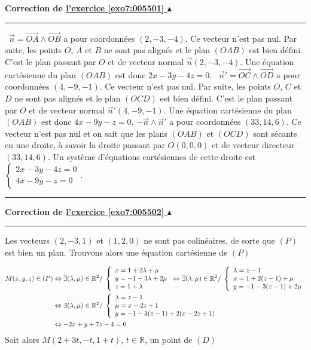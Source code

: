 \documentclass[11pt,a4paper]{article}
\newcommand{\Rr}{\mathbb{R}} \newcommand{\R}{\mathbb{R}}
\newcounter{exo}
\newcommand{\correction}[1]{\hypertarget{cor7:#1}{}\label{cor7:#1}{\bf Correction de \hyperlink{exo7:#1}{l'exercice \ref{exo7:#1} $\blacktriangle$}}\vspace{1mm}\hrule\vspace{1mm}}
\newcommand{\fincorrection}{\vspace{1mm}\hrule\vspace*{7mm}}
\begin{document}
\newpage

\correction{005501}
\textbullet~$\overrightarrow{n}=\overrightarrow{OA}\wedge\overrightarrow{OB}$ a pour coordonnées $(2,-3,-4)$. Ce vecteur n'est pas nul. Par suite, les points $O$, $A$ et $B$ ne sont pas alignés et le plan $(OAB)$ est bien défini. C'est le plan passant par $O$ et de vecteur normal $\overrightarrow{n}(2,-3,-4)$. Une équation cartésienne du plan $(OAB)$ est donc $2x-3y-4z=0$.
\textbullet~$\overrightarrow{n}'=\overrightarrow{OC}\wedge\overrightarrow{OD}$ a pour coordonnées $(4,-9,-1)$. Ce vecteur n'est pas nul. Par suite, les points $O$, $C$ et $D$ ne sont pas alignés et le plan $(OCD)$ est bien défini. C'est le plan passant par $O$ et de vecteur normal $\overrightarrow{n}'(4,-9,-1)$. Une équation cartésienne du plan $(OAB)$ est donc $4x-9y-z=0$.
\textbullet$-\overrightarrow{n}\wedge\overrightarrow{n}'$ a pour coordonnées $(33,14,6)$. Ce vecteur n'est pas nul et on sait que les plans $(OAB)$ et $(OCD)$ sont sécants en une droite, à savoir la droite passant par $O(0,0,0)$ et de vecteur directeur $(33,14,6)$. Un système d'équations cartésiennes de cette droite est 
$\left\{
\begin{array}{l}
2x-3y-4z=0\\
4x-9y-z=0
\end{array}
\right.$.
\fincorrection
\correction{005502}
Les vecteurs $(2,-3,1)$ et $(1,2,0)$ ne sont pas colinéaires, de sorte que $(P)$ est bien un plan. Trouvons alors une équation cartésienne de $(P)$

\begin{align*}\ensuremath
M(x,y,z)\in(P)&\Leftrightarrow\exists(\lambda,\mu)\in\Rr^2/\;
\left\{
\begin{array}{l}
x=1+2\lambda+\mu\\
y=-1-3\lambda+2\mu\\
z=1+\lambda
\end{array}
\right.
\Leftrightarrow\exists(\lambda,\mu)\in\Rr^2/\;
\left\{
\begin{array}{l}
\lambda=z-1\\
x=1+2(z-1)+\mu\\
y=-1-3(z-1)+2\mu
\end{array}
\right.
\\
 &\Leftrightarrow\exists(\lambda,\mu)\in\Rr^2/\;
\left\{
\begin{array}{l}
\lambda=z-1\\
\mu=x-2z+1\\
y=-1-3(z-1)+2(x-2z+1)
\end{array}
\right.
\\
 &\Leftrightarrow
-2x+y+7z-4=0
\end{align*}
Soit alors $M(2+3t,-t,1+t)$, $t\in\Rr$, un point de $(D)$
\end{document}
